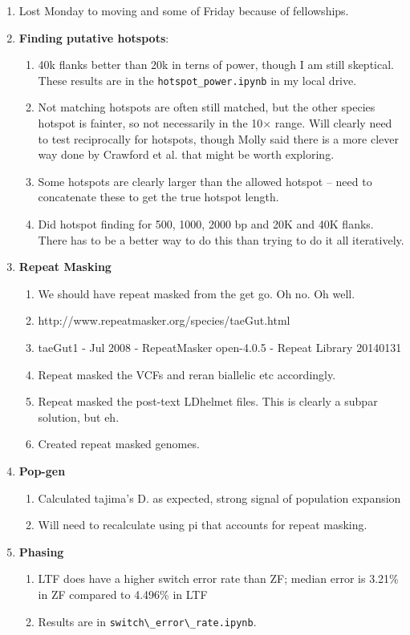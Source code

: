 \documentclass[idxtotoc,hyperref,openany,oneside]{labbook} %
\begin{document}
\begin{enumerate}
\item Lost Monday to moving and some of Friday because of fellowships.
\item \textbf{Finding putative hotspots}:
\begin{enumerate}
\item 40k flanks better than 20k in terns of power, though I am still skeptical. These results are in the \verb+hotspot_power.ipynb+ in my local drive.
\item Not matching hotspots are often still matched, but the other species hotspot is fainter, so not necessarily in the 10$\times$ range. Will clearly need to test reciprocally for hotspots, though Molly said there is a more clever way done by Crawford et al. that might be worth exploring.
\item Some hotspots are clearly larger than the allowed hotspot -- need to concatenate these to get the true hotspot length.
\item Did hotspot finding for 500, 1000, 2000 bp and 20K and 40K flanks. There has to be a better way to do this than trying to do it all iteratively.
\end{enumerate}
\item \textbf{Repeat Masking}
\begin{enumerate}
\item We should have repeat masked from the get go. Oh no. Oh well.
\item http://www.repeatmasker.org/species/taeGut.html
\item taeGut1 - Jul 2008 - RepeatMasker open-4.0.5 - Repeat Library 20140131
\item Repeat masked the VCFs and reran biallelic etc accordingly.
\item Repeat masked the post-text LDhelmet files. This is clearly a subpar solution, but eh.
\item Created repeat masked genomes.
\end{enumerate}
\item \textbf{Pop-gen}
\begin{enumerate}
\item Calculated tajima's D. as expected, strong signal of population expansion
\item Will need to recalculate using pi that accounts for repeat masking.
\end{enumerate}
\item \textbf{Phasing}
\begin{enumerate}
\item LTF does have a higher switch error rate than ZF; median error is 3.21\% in ZF compared to 4.496\% in LTF
\item Results are in \verb+switch\_error\_rate.ipynb+.
\end{enumerate}
\end{enumerate}
\end{document}
